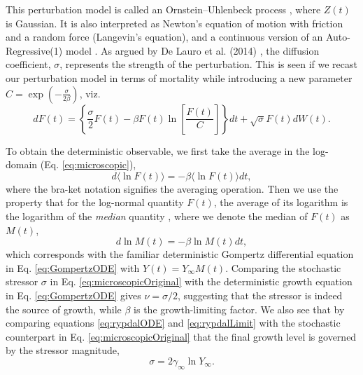 \documentclass[sn-mathphys]{sn-jnl}%
\theoremstyle{thmstyleone}%
\theoremstyle{thmstyletwo}%
\theoremstyle{thmstylethree}%
\begin{document}
This perturbation model is called an Ornstein–Uhlenbeck process \cite{risken1996fokker}, where $Z(t)$ is Gaussian. It is also interpreted as Newton's equation of motion with friction and a random force (Langevin's equation), and a continuous version of an Auto-Regressive(1) model \cite{akaike1970statistical}. As argued by De Lauro et al. (2014) \cite{de2014stochastic}, the diffusion coefficient, $\sigma$, represents the strength of the perturbation. This is seen if we recast our perturbation model in terms of mortality while introducing a new parameter $C=\exp{(-\frac{\sigma}{2\beta})}$, viz. 
\begin{equation}
\label{eq:microscopicOriginal}
dF(t) = \left\{\frac{\sigma}{2}F(t) - \beta F(t)\ln\left[\frac{F(t)}{C}\right]\right\}dt + \sqrt{\sigma}F(t)dW(t).
\end{equation}

To obtain the deterministic observable, we first take the average in the log-domain (Eq. \ref{eq:microscopic}), 
\begin{equation}
d\langle\ln{F(t)}\rangle = -\beta \langle\ln{F(t)}\rangle dt,
\end{equation}
where the bra-ket notation signifies the averaging operation.
Then we use the property that for the log-normal quantity $F(t)$, the average of its logarithm is the logarithm of the \emph{median} quantity \cite{petroni2020gompertz}, where we denote the median of $F(t)$ as $M(t)$, 
\begin{equation}
\label{eq:medianGomp}
d\ln{M(t)} = -\beta \ln{M(t)} dt,
\end{equation}
which corresponds with the familiar deterministic Gompertz differential equation in Eq. \ref{eq:GompertzODE} with $Y(t) = Y_\infty M(t)$. 
Comparing the stochastic stressor $\sigma$ in Eq. \ref{eq:microscopicOriginal} with the deterministic growth equation in Eq. \ref{eq:GompertzODE} gives $\nu=\sigma/2$, suggesting that the stressor is indeed the source of growth, while $\beta$ is the growth-limiting factor. 
We also see that by comparing equations \ref{eq:rypdalODE} and \ref{eq:rypdalLimit} with the stochastic counterpart in Eq. \ref{eq:microscopicOriginal} that the final growth level is governed by the stressor magnitude,
\begin{equation}
\sigma = 2\gamma_{\infty}\ln{Y_{\infty}}.
\end{equation}
\end{document}
